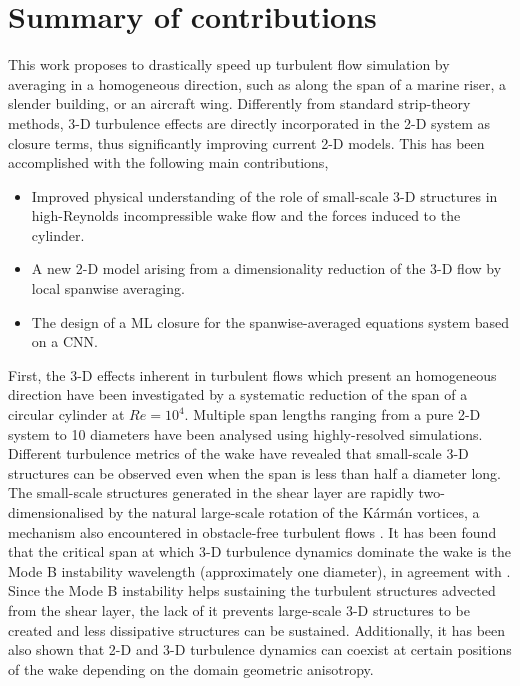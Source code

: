 \documentclass[../main.tex]{subfiles}
\begin{document}
\section{Summary of contributions}

This work proposes to drastically speed up turbulent flow simulation by averaging in a homogeneous direction, such as along the span of a marine riser, a slender building, or an aircraft wing.
Differently from standard strip-theory methods, 3-D turbulence effects are directly incorporated in the 2-D system as closure terms, thus significantly improving current 2-D models.
This has been accomplished with the following main contributions,
\begin{itemize}
	\item Improved physical understanding of the role of small-scale 3-D structures in high-Reynolds incompressible wake flow and the forces induced to the cylinder.
	\item A new 2-D model arising from a dimensionality reduction of the 3-D flow by local spanwise averaging.
	\item The design of a ML closure for the spanwise-averaged equations system based on a CNN.
\end{itemize}

First, the 3-D effects inherent in turbulent flows which present an homogeneous direction have been investigated by a systematic reduction of the span of a circular cylinder at $Re=10^4$.
Multiple span lengths ranging from a pure 2-D system to 10 diameters have been analysed using highly-resolved simulations.
Different turbulence metrics of the wake have revealed that small-scale 3-D structures can be observed even when the span is less than half a diameter long.
The small-scale structures generated in the shear layer are rapidly two-dimensionalised by the natural large-scale rotation of the K\'{a}rm\'{a}n vortices, a mechanism also encountered in obstacle-free turbulent flows \citep{Smith1996,Xia2011}.
It has been found that the critical span at which 3-D turbulence dynamics dominate the wake is the Mode B instability wavelength (approximately one diameter), in agreement with \cite{Bao2016}.
Since the Mode B instability helps sustaining the turbulent structures advected from the shear layer, the lack of it prevents large-scale 3-D structures to be created and less dissipative structures can be sustained.
Additionally, it has been also shown that 2-D and 3-D turbulence dynamics can coexist at certain positions of the wake depending on the domain geometric anisotropy.
\end{document}
